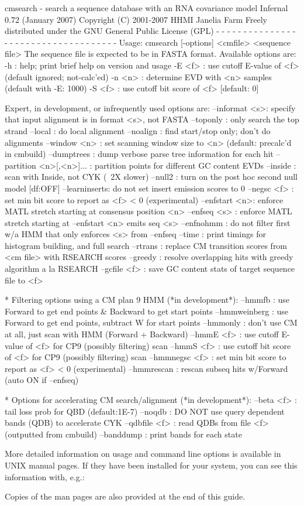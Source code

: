 \begin{sreoutput}
cmsearch - search a sequence database with an RNA covariance model
Infernal 0.72 (January 2007)
Copyright (C) 2001-2007 HHMI Janelia Farm
Freely distributed under the GNU General Public License (GPL)
- - - - - - - - - - - - - - - - - - - - - - - - - - - - - - - - - - - -
Usage: cmsearch [-options] <cmfile> <sequence file>
The sequence file is expected to be in FASTA format.
  Available options are:
   -h     : help; print brief help on version and usage
   -E <f> : use cutoff E-value of <f> (default ignored; not-calc'ed)
   -n <n> : determine EVD with <n> samples (default with -E: 1000)
   -S <f> : use cutoff bit score of <f> [default: 0]

  Expert, in development, or infrequently used options are:
   --informat <s>: specify that input alignment is in format <s>, not FASTA
   --toponly     : only search the top strand
   --local       : do local alignment
   --noalign     : find start/stop only; don't do alignments
   --window <n>  : set scanning window size to <n> (default: precalc'd in cmbuild)
   --dumptrees   : dump verbose parse tree information for each hit
   --partition <n>[,<n>]... : partition points for different GC content EVDs
   --inside      : scan with Inside, not CYK (~2X slower)
   --null2       : turn on the post hoc second null model [df:OFF]
   --learninserts: do not set insert emission scores to 0
   --negsc <f>   : set min bit score to report as <f> < 0 (experimental)
   --enfstart <n>: enforce MATL stretch starting at consensus position <n>
   --enfseq <s>  : enforce MATL stretch starting at --enfstart <n> emits seq <s>
   --enfnohmm    : do not filter first w/a HMM that only enforces <s> from --enfseq
   --time        : print timings for histogram building, and full search
   --rtrans      : replace CM transition scores from <cm file> with RSEARCH scores
   --greedy      : resolve overlapping hits with greedy algorithm a la RSEARCH
   --gcfile <f>  : save GC content stats of target sequence file to <f>

  * Filtering options using a CM plan 9 HMM (*in development*):
   --hmmfb        : use Forward to get end points & Backward to get start points
   --hmmweinberg  : use Forward to get end points, subtract W for start points
   --hmmonly      : don't use CM at all, just scan with HMM (Forward + Backward)
   --hmmE <f>     : use cutoff E-value of <f> for CP9 (possibly filtering) scan
   --hmmS <f>     : use cutoff bit score of <f> for CP9 (possibly filtering) scan
   --hmmnegsc <f> : set min bit score to report as <f> < 0 (experimental)
   --hmmrescan    : rescan subseq hits w/Forward (auto ON if --enfseq)

  * Options for accelerating CM search/alignment (*in development*):
   --beta <f>    : tail loss prob for QBD (default:1E-7)
   --noqdb       : DO NOT use query dependent bands (QDB) to accelerate CYK
   --qdbfile <f> : read QDBs from file <f> (outputted from cmbuild)
   --banddump    : print bands for each state

\end{sreoutput}

More detailed information on usage and command line options is
available in UNIX manual pages. If they have been installed for your
system, you can see this information with, e.g.:


Copies of the man pages are also provided at the end of this guide.





